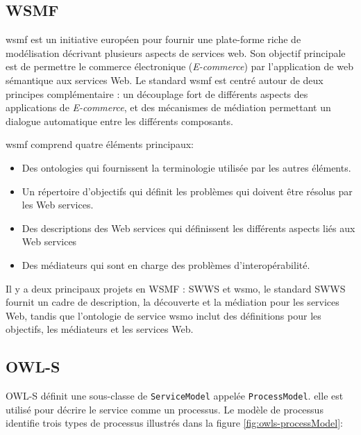   \subsection{WSMF}
  \label{sec:wsmf}
  \acrshort{wsmf} \cite{fensel2002web} est un initiative européen pour
  fournir une plate-forme riche de modélisation décrivant plusieurs
  aspects de services web. Son objectif principale est de permettre le
  commerce électronique (\emph{E-commerce}) par l'application de web
  sémantique aux services Web.  Le standard \acrshort{wsmf} est centré
  autour de deux principes complémentaire \cite{baryannis2010}: un
  découplage fort de différents aspects des applications de
  \textit{E-commerce}, et des mécanismes de médiation permettant un
  dialogue automatique entre les différents composants.\medskip

  \acrshort{wsmf} comprend quatre éléments principaux:

  \SpecialItem
  \begin{itemize}
  \item Des ontologies qui fournissent la terminologie utilisée par
    les autres éléments.

  \item Un répertoire d'objectifs qui définit les problèmes qui
    doivent être résolus par les Web services.

  \item Des descriptions des Web services qui définissent les
    différents aspects liés aux Web services

  \item Des médiateurs qui sont en charge des problèmes
    d'interopérabilité.
  \end{itemize}
  \enddescription

  Il y a deux principaux projets en WSMF : \textsc{SWWS} et
  \acrshort{wsmo}, le standard \textsc{SWWS} fournit un cadre de
  description, la découverte et la médiation pour les services Web,
  tandis que l'ontologie de service \acrshort{wsmo} inclut des
  définitions pour les objectifs, les médiateurs et les services Web.

  \subsection{OWL-S}
  \label{sec:owl-s}

  

  \textsc{OWL-S} définit une sous-classe de \verb|ServiceModel|
  appelée \verb|ProcessModel|. elle est utilisé pour décrire le
  service comme un processus. Le modèle de processus identifie trois
  types de processus illustrés dans la figure
  \ref{fig:owls-processModel}:

